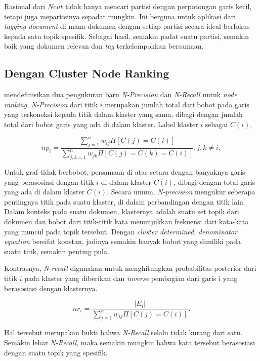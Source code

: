 Rasional dari \(Ncut\) tidak hanya mencari partisi dengan perpotongan garis kecil, tetapi juga mepartisinya sepadat mungkin. Ini berguna untuk aplikasi dari \textit{tagging document} di mana dokumen dengan setiap partisi secara ideal berfokus kepada satu topik spesifik. Sebagai hasil, semakin padat suatu partisi, semakin baik yang dokumen relevan dan \textit{tag} terkelompokkan bersamaan.

\subsection{Dengan Cluster Node Ranking}

\cite{song2008autotag} mendefinisikan dua pengukuran baru \textit{N-Precision} dan \textit{N-Recall} untuk \textit{node ranking}. \textit{N-Precision} dari titik \(i\) merupakan jumlah total dari bobot pada garis yang terkoneksi kepada titik dalam klaster yang sama, dibagi dengan jumlah total dari bobot garis yang ada di dalam klaster. Label klaster \(i\) sebagai \(C(i)\),

\begin{equation}
\label{n_precision}
    np_i=\frac{\sum_{j=1}^{n}w_{ij}\Pi[C(j) = C(i)]}{\sum_{j,k=1}^{n}w_{jk}\Pi[C(j) = C(k) = C(i)]},j,k\neq i,
\end{equation}

Untuk graf tidak berbobot, persamaan di atas setara dengan banyaknya garis yang berasosiasi dengan titik \(i\) di dalam klaster \(C(i)\), dibagi dengan total garis yang ada di dalam klaster \(C(i)\). Secara umum, \textit{N-precision} mengukur seberapa pentingnya titik pada suatu klaster, di dalam perbandingan dengan titik lain. Dalam konteks pada suatu dokumen, klasternya adalah suatu set topik dari dokumen dan bobot dari titik-titik kata menunjukkan frekuensi dari kata-kata yang muncul pada topik tersebut. Dengan \textit{cluster determined}, \textit{denominator equation} bersifat konstan, jadinya semakin banyak bobot yang dimiliki pada suatu titik, semakin penting pula.

Kontrasnya, \textit{N-recall} digunakan untuk menghitungkan probabilitas posterior dari titik \(i\) pada klaster yang diberikan dan \textit{inverse} pembagian dari garis i yang berasosiasi dengan klasternya.

\begin{equation} \label{n_recall}
    nr_i= \frac{|E_i|}{\sum_{j=1}^{n}w_{ij}\Pi[C(j) = C(i)]}.
\end{equation}

Hal tersebut merupakan bukti bahwa \textit{N-Recall} selalu tidak kurang dari satu. Semakin lebar \textit{N-Recall}, maka semakin mungkin bahwa kata tersebut berasosiasi dengan suatu topik yang spesifik.

